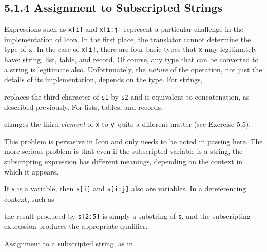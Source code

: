 
\subsection[5.1.4 Assignment to Subscripted Strings]{5.1.4 Assignment to Subscripted Strings}

Expressions such as \texttt{x[i]} and \texttt{x[i:j]} represent a
particular challenge in the implementation of Icon. In the first
place, the translator cannot determine the type of x. In the case of
\texttt{x[i]}, there are four basic types that \texttt{x} may
legitimately have: string, list, table, and record. Of course, any
type that can be converted to a string is legitimate
also. Unfortunately, the \textit{nature }of the operation, not just
the details of its implementation, depends on the type. For strings,


\noindent replaces the third character of \texttt{s1} by \texttt{s2}
and is equivalent to concatenation, as described previously.  For
lists, tables, and records,


\noindent changes the third \textit{element }of \texttt{x} to
\texttt{y}{}--quite a different matter (see Exercise 5.5).

This problem is pervasive in Icon and only needs to be noted in
passing here. The more serious problem is that even if the subscripted
variable is a string, the subscripting expression has different
meanings, depending on the context in which it appears.

If \texttt{s} is a variable, then \texttt{s[i]} and \texttt{s[i:j]}
also are variables. In a dereferencing context, such as


\noindent the result produced by \texttt{s[2:5]} is simply a substring
of \texttt{s}, and the subscripting expression produces the
appropriate qualifier.

Assignment to a subscripted string, as in


